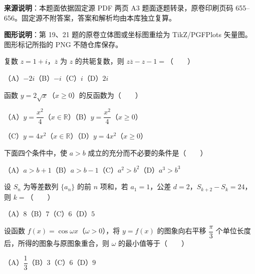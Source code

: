 


\begin{gktip}
\textbf{来源说明}：本题面依据固定源 PDF 两页 A3 题面逐题转录，原卷印刷页码 655–656。固定源不附答案，答案和解析均由本库独立复算。

\textbf{图形说明}：第 19、21 题的原卷立体图或坐标图重绘为 TikZ/PGFPlots 矢量图。图形标记所指的 PNG 不随仓库保存。
\end{gktip}


\begin{question}
复数 $z=1+i$，$\overline z$ 为 $z$ 的共轭复数，则 $z\overline z-z-1=$\mbox{（　　）}

（A）$-2i$\quad（B）$-i$\quad（C）$i$\quad（D）$2i$

\end{question}
\begin{question}
函数 $y=2\sqrt{x}$（$x\geq0$）的反函数为\mbox{（　　）}

（A）$y=\dfrac{x^2}{4}$（$x\in\mathbb R$）\quad（B）$y=\dfrac{x^2}{4}$（$x\geq0$）

（C）$y=4x^2$（$x\in\mathbb R$）\quad（D）$y=4x^2$（$x\geq0$）

\end{question}
\begin{question}
下面四个条件中，使 $a>b$ 成立的充分而不必要的条件是\mbox{（　　）}

（A）$a>b+1$\quad（B）$a>b-1$\quad（C）$a^2>b^2$\quad（D）$a^3>b^3$

\end{question}
\begin{question}
设 $S_n$ 为等差数列 $\{a_n\}$ 的前 $n$ 项和，若 $a_1=1$，公差 $d=2$，$S_{k+2}-S_k=24$，则 $k=$\mbox{（　　）}

（A）$8$\quad（B）$7$\quad（C）$6$\quad（D）$5$

\end{question}
\begin{question}
设函数 $f(x)=\cos\omega x$（$\omega>0$），将 $y=f(x)$ 的图象向右平移 $\dfrac\pi3$ 个单位长度后，所得的图象与原图象重合，则 $\omega$ 的最小值等于\mbox{（　　）}

（A）$\dfrac13$\quad（B）$3$\quad（C）$6$\quad（D）$9$

\end{question}
